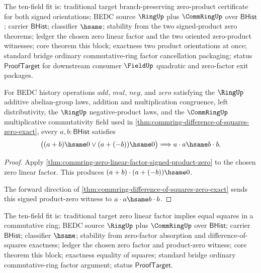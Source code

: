 The ten-field fit is: traditional target branch-preserving zero-product
certificate for both signed orientations; BEDC source $\RingUp$ plus
$\CommRingUp$ over $\mathsf{BHist}$; carrier $\mathsf{BHist}$; classifier
$\hsame$; stability from the two signed-product zero theorems; ledger the
chosen zero linear factor and the two oriented zero-product witnesses; core
theorem this block; exactness two product orientations at once; standard bridge
ordinary commutative-ring factor cancellation packaging; status
$\mathsf{ProofTarget}$ for downstream consumer $\FieldUp$ quadratic and
zero-factor exit packages.

\begin{theorem}
\label{thm:commring-zero-linear-factor-equal-squares}
For BEDC history operations $add$, $mul$, $neg$, and $zero$ satisfying the
$\RingUp$ additive abelian-group laws, addition and multiplication congruence,
left distributivity, the $\RingUp$ negative-product laws, and the
$\CommRingUp$ multiplicative commutativity field used in
\autoref{thm:commring-difference-of-squares-zero-exact}, every
$a,b : \mathsf{BHist}$ satisfies
$$
\bigl((a+b)\hsame0 \lor (a+(-b))\hsame0\bigr)
\Longrightarrow
a\cdot a\hsame b\cdot b .
$$
\end{theorem}
\begin{proof}
Apply \autoref{thm:commring-zero-linear-factor-signed-product-zero} to the
chosen zero linear factor. This produces
$(a+b)\cdot(a+(-b))\hsame0$.

The forward direction of
\autoref{thm:commring-difference-of-squares-zero-exact} sends this signed
product-zero witness to $a\cdot a\hsame b\cdot b$.
\end{proof}

The ten-field fit is: traditional target zero linear factor implies equal
squares in a commutative ring; BEDC source $\RingUp$ plus $\CommRingUp$ over
$\mathsf{BHist}$; carrier $\mathsf{BHist}$; classifier $\hsame$; stability
from zero-factor absorption and difference-of-squares exactness; ledger the
chosen zero factor and product-zero witness; core theorem this block; exactness
equality of squares; standard bridge ordinary commutative-ring factor argument;
status $\mathsf{ProofTarget}$.

